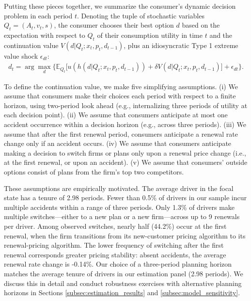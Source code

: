 Putting these pieces together, we summarize the consumer's dynamic decision problem in each period $t$. Denoting the tuple of stochastic variables $Q_t = (A_t, v_t, s)$, the consumer chooses their best option $d$ based on the expectation with respect to $Q_t$ of their consumption utility in time $t$ and the continuation value $V(d | Q_t; x_t, p_t, d_{t-1} )$, plus an idiosyncratic Type 1 extreme value shock $\epsilon_{dt}$:
%
\begin{align}\label{eq:dynamic_decision_model}
d_{t} =  \arg\max_{d}\Big\{\mathbb{E}_{Q_{t}}\Big[u(h(d|Q_t; x_t, p_t, d_{t-1})) + \delta V(d|Q_t; x_t, p_t, d_{t-1})\Big] + \epsilon_{dt}\Big\}.
\end{align}

To define the continuation value, we make five simplifying assumptions. (i)  We assume that consumers make their choices each period with respect to a finite horizon, using two-period look ahead (e.g., internalizing three periods of utility at each decision point). (ii) We assume that consumers anticipate at most one accident occurrence within a decision horizon (e.g., across three periods). (iii) We assume that after the first renewal period, consumers anticipate a renewal rate change only if an accident occurs. (iv) We assume that consumers anticipate making a decision to switch firms or plans only upon a renewal price change (i.e., at the first renewal, or upon an accident). (v) We assume that consumers' outside options consist of plans from the firm's top two competitors.

These assumptions are empirically motivated. The average driver in the focal state has a tenure of 2.98 periods.
Fewer than 0.5\% of drivers in our sample incur multiple accidents within a range of three periods. Only 1.3\% of drivers make multiple switches---either to a new plan or a new firm---across up to 9 renewals per driver. Among observed switches, nearly half (44.2\%)  occur at the first renewal, when the firm transitions from its new-customer pricing algorithm to its renewal-pricing algorithm. The lower frequency of switching after the first renewal corresponds greater pricing stability: absent accidents, the average renewal rate change is -0.14\%.
Our choice
of a three-period planning horizon matches the average tenure of drivers in our estimation panel (2.98 periods). We discuss this in detail and conduct robustness exercises with alternative planning horizons in Sections \ref{subsec:estimation_results} and \ref{subsec:model_sensitivity}.

